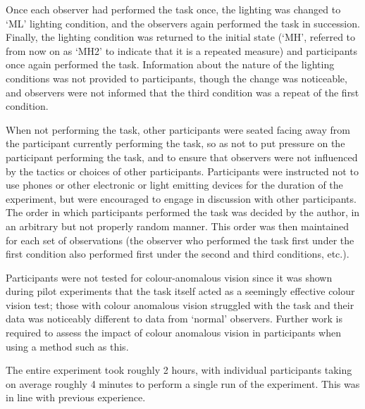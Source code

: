 Once each observer had performed the task once, the lighting was changed to `ML' lighting condition, and the observers again performed the task in succession. Finally, the lighting condition was returned to the initial state (`MH', referred to from now on as `MH2' to indicate that it is a repeated measure) and participants once again performed the task. Information about the nature of the lighting conditions was not provided to participants, though the change was noticeable, and observers were not informed that the third condition was a repeat of the first condition. 

When not performing the task, other participants were seated facing away from the participant currently performing the task, so as not to put pressure on the participant performing the task, and to ensure that observers were not influenced by the tactics or choices of other participants. Participants were instructed not to use phones or other electronic or light emitting devices for the duration of the experiment, but were encouraged to engage in discussion with other participants. The order in which participants performed the task was decided by the author, in an arbitrary but not properly random manner. This order was then maintained for each set of observations (the observer who performed the task first under the first condition also performed first under the second and third conditions, etc.).

Participants were not tested for colour-anomalous vision since it was shown during pilot experiments that the task itself acted as a seemingly effective colour vision test; those with colour anomalous vision struggled with the task and their data was noticeably different to data from `normal' observers. Further work is required to assess the impact of colour anomalous vision in participants when using a method such as this. 

The entire experiment took roughly 2 hours, with individual participants taking on average roughly 4 minutes to perform a single run of the experiment. This was in line with previous experience.



